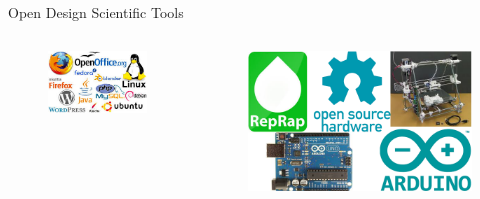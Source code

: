 \documentclass{beamer}
\begin{document}
\begin{frame}{Open Design Scientific Tools}
\begin{columns}
\begin{figure}
\includegraphics[width=1\linewidth]{images/opensource-software.jpeg}
 \end{figure}
\begin{figure}
\includegraphics[width=1\linewidth]{images/opensource-hardware.png}
 \end{figure}
\end{columns}
\end{frame}
\end{document}
